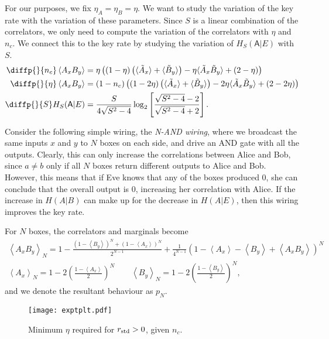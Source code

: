 \documentclass[10pt, a4paper]{article}
\numberwithin{equation}{section} %
\theoremstyle{definition}
\theoremstyle{plain}
\newcommand{\?}{\mathrel{?}} %
\newcommand{\angleb}[1]{\left\langle #1 \right\rangle} %
\newcommand{\crv}[1]{\mathsf{#1}}
\newcommand{\std}{\rm std}
\begin{document}
      For our purposes, we fix \(\eta_A = \eta_B = \eta\). We want to study the variation of the key rate with the variation of these parameters. Since \(S\) is a linear combination of the correlators, we only need to compute the variation of the correlators with \(\eta\) and \(n_c\). We connect this to the key rate by studying the variation of \(H_S(\crv{A}|E)\) with \(S\).
      \begin{align*}
        \diffp{}{{n_c}} \angleb{A_x B_y} &= \eta \left( \left(1-\eta\right) \left(\langle\tilde{A}_x\rangle + \langle\tilde{B}_y\rangle\right) - \eta \langle\tilde{A}_x\tilde{B}_y\rangle + \left(2 - \eta\right) \right) \\
        \diffp{}{{\eta}} \angleb{A_x B_y} &= \left(1 - n_{c}\right) \left( \left(1-2\eta\right) \left(\langle\tilde{A}_x\rangle+\langle\tilde{B}_y\rangle\right) - 2\eta \langle\tilde{A}_x\tilde{B}_y\rangle + (2-2\eta) \right) \\
        \diffp{}{S} H_S(\crv{A}|E) &= \frac{S}{4\sqrt{S^2-4}} \log_2 \left[ \frac{\sqrt{S^2-4}-2}{\sqrt{S^2-4}+2} \right].
      \end{align*}

      Consider the following simple wiring, the \emph{N-AND wiring}, where we broadcast the same inputs \(x\) and \(y\) to \(N\) boxes on each side, and drive an AND gate with all the outputs. Clearly, this can only increase the correlations between Alice and Bob, since \(a \neq b\) only if all \(N\) boxes return different outputs to Alice and Bob. However, this means that if Eve knows that any of the boxes produced 0, she can conclude that the overall output is 0, increasing her correlation with Alice. If the increase in \(H(A|B)\) can make up for the decrease in \(H(A|E)\), then this wiring improves the key rate.

      For \(N\) boxes, the correlators and marginals become
      \begin{gather}
        \angleb{A_x B_y}_{N} = 1 - \frac{{(1-\angleb{B_y})}^N + {(1-\angleb{A_x})}^N}{2^{N-1}} + \frac{1}{4^{N-1}} {(1-\angleb{A_x} - \angleb{B_y} + \angleb{A_x B_y})}^{N} \\
        \angleb{A_x}_{N} = 1 - 2 {\left(\frac{1-\angleb{A_x}}{2}\right)}^N \qquad \angleb{B_y}_{N} = 1 - 2 {\left(\frac{1-\angleb{B_y}}{2}\right)}^N,
      \end{gather}
      and we denote the resultant behaviour as \(p_N\).

      \begin{figure}
        \centering
        \texttt{[image: exptplt.pdf]}
        \caption{\label{fig:exptplt} Minimum \(\eta\) required for \(r_{\std} > 0\), given \(n_c\).}
      \end{figure}
\end{document}
